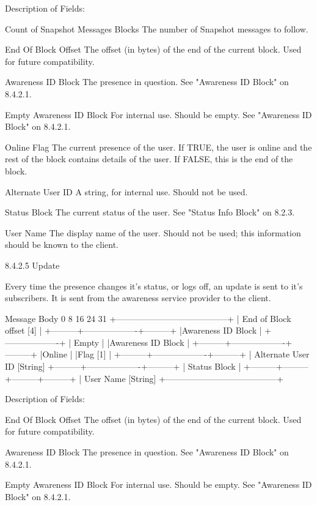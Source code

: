 \documentclass[titlepage,oneside]{book}
\begin{document}
Description of Fields:

Count of Snapshot Messages Blocks
  The number of Snapshot messages to follow.

End Of Block Offset
  The offset (in bytes) of the end of the current block. Used for
  future compatibility.

Awareness ID Block
  The presence in question. See "Awareness ID Block" on
8.4.2.1.

Empty Awareness ID Block
  For internal use. Should be empty. See "Awareness ID Block" on
  8.4.2.1.

Online Flag
  The current presence of the user. If TRUE, the user is online and
  the rest of the block contains details of the user. If FALSE, this
  is the end of the block.

Alternate User ID
  A string, for internal use. Should not be used.

Status Block
  The current status of the user. See "Status Info Block" on
8.2.3.

User Name
  The display name of the user. Should not be used; this information
  should be known to the client.

8.4.2.5 Update

Every time the presence changes it's status, or logs off, an update is
sent to it's subscribers. It is sent from the awareness service
provider to the client.

Message Body
0         8         16        24      31
+---------------------------------------+
|      End of Block offset [4]          |
+---------+-------------------+---------+
          |Awareness ID Block |
          +-------------------+
          |       Empty       |
          |Awareness ID Block |
+---------+-------------------+---------+
|Online   |
|Flag [1] |
+---------+-------------------+---------+
| Alternate User ID [String]
+---------+-------------------+---------+
          |   Status Block    |
+---------+---------+---------+---------+
| User Name [String]
+---------------------------------------+

Description of Fields:

End Of Block Offset
  The offset (in bytes) of the end of the current block. Used for
  future compatibility.

Awareness ID Block
  The presence in question. See "Awareness ID Block" on
8.4.2.1.

Empty Awareness ID Block
  For internal use. Should be empty. See "Awareness ID Block" on
  8.4.2.1.
\end{document}
